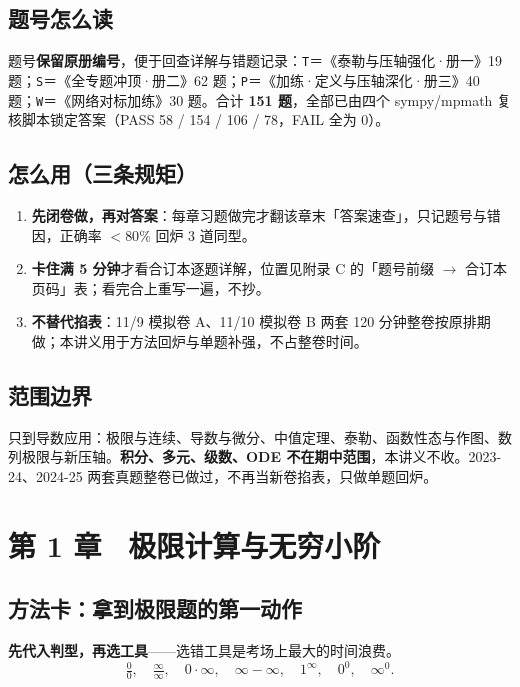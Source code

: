 \documentclass[11pt,a4paper]{ctexart}
\begin{document}
\subsection*{题号怎么读}
题号\textbf{保留原册编号}，便于回查详解与错题记录：\texttt{T}＝《泰勒与压轴强化·册一》19 题；\texttt{S}＝《全专题冲顶·册二》62 题；\texttt{P}＝《加练·定义与压轴深化·册三》40 题；\texttt{W}＝《网络对标加练》30 题。合计 \textbf{151 题}，全部已由四个 sympy/mpmath 复核脚本锁定答案（PASS 58 / 154 / 106 / 78，FAIL 全为 0）。

\subsection*{怎么用（三条规矩）}
\begin{enumerate}
\item \textbf{先闭卷做，再对答案}：每章习题做完才翻该章末「答案速查」，只记题号与错因，正确率 $<80\%$ 回炉 3 道同型。
\item \textbf{卡住满 5 分钟}才看合订本逐题详解，位置见附录 C 的「题号前缀 $\to$ 合订本页码」表；看完合上重写一遍，不抄。
\item \textbf{不替代掐表}：11/9 模拟卷 A、11/10 模拟卷 B 两套 120 分钟整卷按原排期做；本讲义用于方法回炉与单题补强，不占整卷时间。
\end{enumerate}

\subsection*{范围边界}
只到导数应用：极限与连续、导数与微分、中值定理、泰勒、函数性态与作图、数列极限与新压轴。\textbf{积分、多元、级数、ODE 不在期中范围}，本讲义不收。2023-24、2024-25 两套真题整卷已做过，不再当新卷掐表，只做单题回炉。

\newpage
\tableofcontents
\newpage
\section{第 1 章 \ 极限计算与无穷小阶}
\subsection{方法卡：拿到极限题的第一动作}

\textbf{先代入判型，再选工具}——选错工具是考场上最大的时间浪费。
\[
\tfrac00,\quad\tfrac{\infty}{\infty},\quad 0\cdot\infty,\quad\infty-\infty,\quad 1^\infty,\quad 0^0,\quad \infty^0 .
\]
\end{document}
